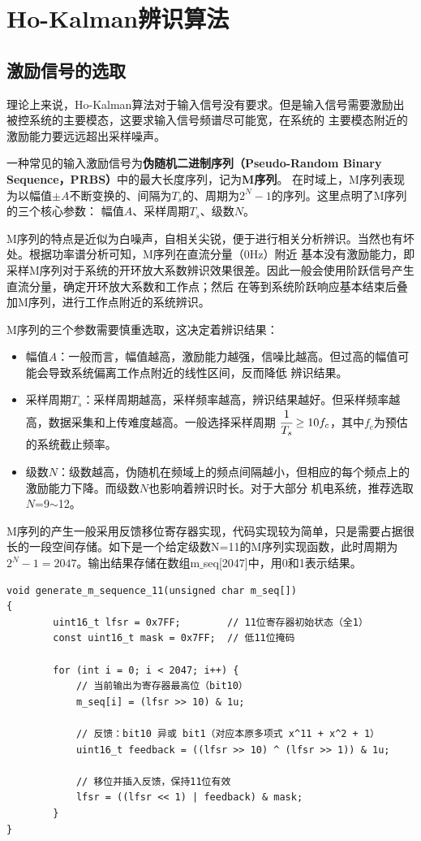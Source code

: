\newpage
\section{Ho-Kalman辨识算法\label{sec:Ho-Kalman辨识过程介绍}}
\subsection{激励信号的选取}
理论上来说，Ho-Kalman算法对于输入信号没有要求。但是输入信号需要激励出被控系统的主要模态，这要求输入信号频谱尽可能宽，在系统的
主要模态附近的激励能力要远远超出采样噪声。

一种常见的输入激励信号为\textbf{伪随机二进制序列（Pseudo-Random Binary Sequence，PRBS）}中的最大长度序列，记为\textbf{M序列}。
在时域上，M序列表现为以幅值\(\pm A\)不断变换的、间隔为\(T_s\)的、周期为\(2^{N}-1\)的序列。这里点明了M序列的三个核心参数：
幅值\(A\)、采样周期\(T_s\)、级数\(N\)。

M序列的特点是近似为白噪声，自相关尖锐，便于进行相关分析辨识。当然也有坏处。根据功率谱分析可知，M序列在直流分量（0Hz）附近
基本没有激励能力，即采样M序列对于系统的开环放大系数辨识效果很差。因此一般会使用阶跃信号产生直流分量，确定开环放大系数和工作点；然后
在等到系统阶跃响应基本结束后叠加M序列，进行工作点附近的系统辨识。

M序列的三个参数需要慎重选取，这决定着辨识结果：

\begin{itemize}
    \item 幅值\(A\)：一般而言，幅值越高，激励能力越强，信噪比越高。但过高的幅值可能会导致系统偏离工作点附近的线性区间，反而降低
    辨识结果。
    \item 采样周期\(T_s\)：采样周期越高，采样频率越高，辨识结果越好。但采样频率越高，数据采集和上传难度越高。一般选择采样周期
    \(\cfrac{1}{T_s}\ge 10f_c\)，其中\(f_c\)为预估的系统截止频率。
    \item 级数\(N\)：级数越高，伪随机在频域上的频点间隔越小，但相应的每个频点上的激励能力下降。而级数\(N\)也影响着辨识时长。对于大部分
    机电系统，推荐选取\(N\)=9\(\sim\)12。
\end{itemize}

M序列的产生一般采用反馈移位寄存器实现，代码实现较为简单，只是需要占据很长的一段空间存储。如下是一个给定级数N=11的M序列实现函数，此时周期为\(2^{N}-1=2047\)。输出结果存储在数组m\(\_\)seq[2047]中，用0和1表示结果。

\begin{lstlisting}
void generate_m_sequence_11(unsigned char m_seq[])
{
        uint16_t lfsr = 0x7FF;        // 11位寄存器初始状态（全1）
        const uint16_t mask = 0x7FF;  // 低11位掩码

        for (int i = 0; i < 2047; i++) {
            // 当前输出为寄存器最高位（bit10）
            m_seq[i] = (lfsr >> 10) & 1u;

            // 反馈：bit10 异或 bit1（对应本原多项式 x^11 + x^2 + 1）
            uint16_t feedback = ((lfsr >> 10) ^ (lfsr >> 1)) & 1u;

            // 移位并插入反馈，保持11位有效
            lfsr = ((lfsr << 1) | feedback) & mask;
        }
}
\end{lstlisting}
